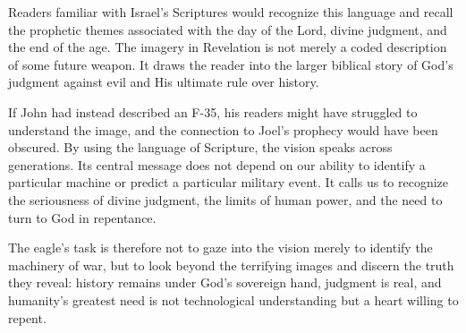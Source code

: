 Readers familiar with Israel's Scriptures would recognize this language and recall the prophetic themes associated with the day of the Lord, divine judgment, and the end of the age. The imagery in Revelation is not merely a coded description of some future weapon. It draws the reader into the larger biblical story of God's judgment against evil and His ultimate rule over history.

If John had instead described an F-35, his readers might have struggled to understand the image, and the connection to Joel's prophecy would have been obscured. By using the language of Scripture, the vision speaks across generations. Its central message does not depend on our ability to identify a particular machine or predict a particular military event. It calls us to recognize the seriousness of divine judgment, the limits of human power, and the need to turn to God in repentance.

The eagle's task is therefore not to gaze into the vision merely to identify the machinery of war, but to look beyond the terrifying images and discern the truth they reveal: history remains under God's sovereign hand, judgment is real, and humanity's greatest need is not technological understanding but a heart willing to repent.
